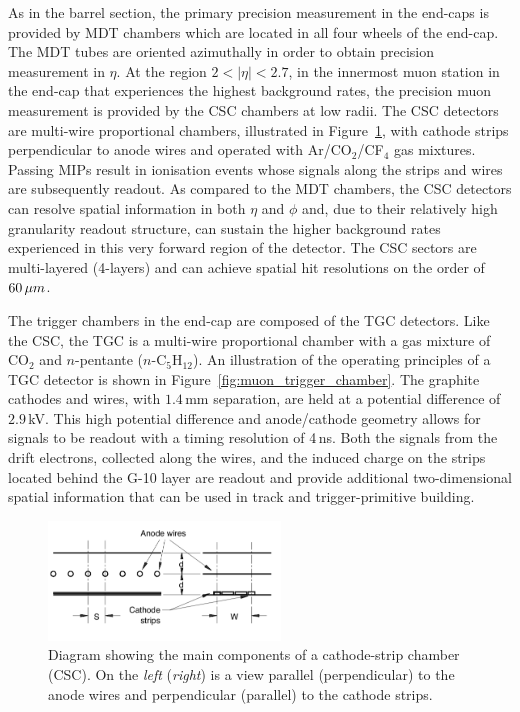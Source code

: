 As in the barrel section, the primary precision measurement in the end-caps is provided
by MDT chambers which are located in all four wheels of the end-cap.
The MDT tubes are oriented azimuthally in order to obtain precision measurement in $\eta$.
At the region $2 < \lvert \eta \rvert < 2.7$, in the innermost muon station
in the end-cap that experiences the highest background rates,
the precision muon measurement is provided by the CSC chambers at low radii.
The CSC detectors are multi-wire proportional chambers, illustrated in Figure~\ref{fig:csc_chamber},
with cathode strips perpendicular to anode wires and operated with Ar/CO$_2$/CF$_4$ gas mixtures.
Passing MIPs result in ionisation events whose signals along the strips and wires are
subsequently readout.
As compared to the MDT chambers, the CSC detectors can resolve spatial information in both $\eta$ and $\phi$
and, due to their relatively high granularity readout structure, can sustain the higher
background rates experienced in this very forward region of the detector.
The CSC sectors are multi-layered (4-layers) and can achieve spatial hit resolutions on the order
of $60\,\mu m$.

The trigger chambers in the end-cap are composed of the TGC detectors.
Like the CSC, the TGC is a multi-wire proportional chamber with a gas mixture
of CO$_2$ and $n$-pentante ($n$-C$_5$H$_{12}$).
An illustration of the operating principles of a TGC detector is shown in Figure~\ref{fig:muon_trigger_chamber}.
The graphite cathodes and wires, with $1.4$\,mm separation, are held at a potential
difference of $2.9$\,kV.
This high potential difference and anode/cathode geometry allows for signals to be readout
with a timing resolution of 4\,ns.
Both the signals from the drift electrons, collected along the wires, and the induced
charge on the strips located behind the G-10 layer are readout and provide additional
two-dimensional spatial information that can be used in track and trigger-primitive building.


\begin{figure}[!htb]
    \begin{center}
        \includegraphics[width=0.55\textwidth]{figures/chapter2/muon_spec/csc_chamber}
        \caption{
            Diagram showing the main components of a cathode-strip chamber (CSC).
            On the \textit{left} (\textit{right}) is a view parallel (perpendicular) to the anode
            wires and perpendicular (parallel) to the cathode strips.
        }
        \label{fig:csc_chamber}
    \end{center}
\end{figure}

